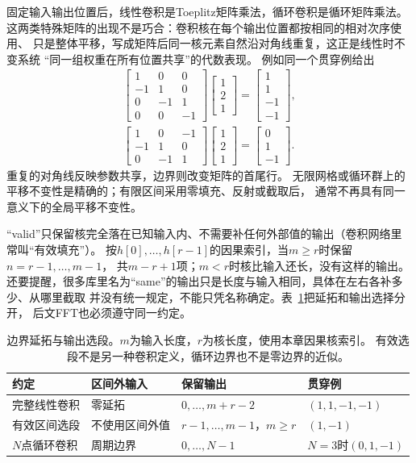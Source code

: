 固定输入输出位置后，线性卷积是Toeplitz矩阵乘法，循环卷积是循环矩阵乘法。
这两类特殊矩阵的出现不是巧合：卷积核在每个输出位置都按相同的相对次序使用、
只是整体平移，写成矩阵后同一核元素自然沿对角线重复，这正是线性时不变系统
“同一组权重在所有位置共享”的代数表现。
例如同一个贯穿例给出
\begin{gather*}
  \begin{bmatrix}
    1&0&0\\-1&1&0\\0&-1&1\\0&0&-1
  \end{bmatrix}
  \begin{bmatrix}1\\2\\1\end{bmatrix}
  =\begin{bmatrix}1\\1\\-1\\-1\end{bmatrix},\\
  \begin{bmatrix}1&0&-1\\-1&1&0\\0&-1&1\end{bmatrix}
  \begin{bmatrix}1\\2\\1\end{bmatrix}
  =\begin{bmatrix}0\\1\\-1\end{bmatrix}.
\end{gather*}
重复的对角线反映参数共享，边界则改变矩阵的首尾行。
无限网格或循环群上的平移不变性是精确的；有限区间采用零填充、反射或截取后，
通常不再具有同一意义下的全局平移不变性。

“valid”只保留核完全落在已知输入内、不需要补任何外部值的输出（卷积网络里常叫“有效填充”）。
按$h[0],\ldots,h[r-1]$的因果索引，当$m\geq r$时保留$n=r-1,\ldots,m-1$，
共$m-r+1$项；$m<r$时核比输入还长，没有这样的输出。
还要提醒，很多库里名为“same”的输出只是长度与输入相同，具体在左右各补多少、从哪里截取
并没有统一规定，不能只凭名称确定。表~\ref{tab:signal-boundary-conventions}把延拓和输出选择分开，
后文FFT也必须遵守同一约定。
\begin{table}[!htb]
  \centering
  \begin{tabularx}{\linewidth}{lXXX}
    \toprule
    约定 & 区间外输入 & 保留输出 & 贯穿例\\
    \midrule
    完整线性卷积 & 零延拓 & $0,\ldots,m+r-2$ & $(1,1,-1,-1)$\\
    有效区间选段 & 不使用区间外值 & $r-1,\ldots,m-1$，$m\geq r$ & $(1,-1)$\\
    $N$点循环卷积 & 周期边界 & $0,\ldots,N-1$ & $N=3$时$(0,1,-1)$\\
    \bottomrule
  \end{tabularx}
  \caption{边界延拓与输出选段。$m$为输入长度，$r$为核长度，使用本章因果核索引。
  有效选段不是另一种卷积定义，循环边界也不是零边界的近似。}
  \label{tab:signal-boundary-conventions}
\end{table}

